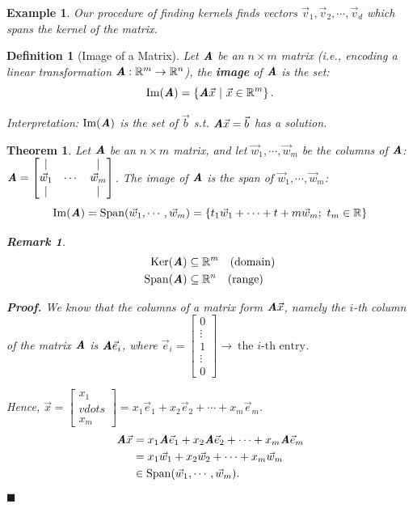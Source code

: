 \documentclass[12pt, a4paper]{article}
\newtheorem{thm}{Theorem}[subsection]
\newtheorem{df}{Definition}[subsection]
\newtheorem{eg}{Example}[subsection]
\newtheorem*{rmk}{\indent Remark}
\newenvironment*{prf}{\indent\textbf{\textit{Proof. }}}{\hfill $\blacksquare$\par}
\def\R{{\mathbb{R}}}
\def\IM{{\mathrm{Im}}}
\def\Span{\mathrm{Span}}
\def\Ker{\mathrm{Ker}}
\def\vecx{\vec{x}}
\def\vecv{\vec{v}}
\def\vecw{\vec{w}}
\def\vecb{\vec{b}}
\def\vece{\vec{e}}
\def\matrixA{\textbf{\emph{A}}}
\begin{document}
\begin{eg}
	Our procedure of finding kernels finds vectors $\vecv_1,\vecv_2,\cdots,\vecv_d$ which spans the kernel of the matrix.	
\end{eg}
\begin{df}[Image of a Matrix]
	Let $\matrixA$ be an $n\times m$ matrix (i.e., encoding a linear transformation $\matrixA:\R^m\to\R^n$), the \textbf{image} of $\matrixA$	 is the set: 
	\[\IM(\matrixA)=\left\{\matrixA\vecx\ |\ \vecx\in\R^m\right\}.\]
	
	Interpretation: $\IM(\matrixA)$ is the set of $\vecb$ \emph{s.t.} $\matrixA\vecx=\vecb$ has a solution.
\end{df}
\begin{thm}
	Let $\matrixA$ be an $n\times m$ matrix, and let	 $\vecw_1,\cdots,\vecw_m$ be the columns of $\matrixA$: $\matrixA=\begin{bmatrix}|&&|\\\vecw_1&\cdots&\vecw_m\\|&&|\end{bmatrix}$. The image of $\matrixA$ is the span of $\vecw_1,\cdots,\vecw_m$: 
	\[\IM(\matrixA)=\Span(\vecw_1,\cdots,\vecw_m)=\left\{t_1\vecw_1+\cdots+t+m\vecw_m;\ t_m\in\R\right\}\]
	\begin{rmk}
		\[\begin{aligned}\Ker(\matrixA)&\subseteq\R^m\quad\text{(domain)}\\\Span(\matrixA)&\subseteq\R^n\quad\text{(range)}\end{aligned}\]	
	\end{rmk}
	\begin{prf}
		We know that the columns of a matrix form $\matrixA\vecx$, namely the $i$-th column of the matrix $\matrixA$ is $\matrixA\vec{e}_i$, where $\vece_i=\begin{bmatrix}0\\\vdots\\1\\\vdots\\0\end{bmatrix} \rightarrow \ \text{the }i\text{-th entry}$.
		
		Hence, $\vecx=\begin{bmatrix}x_1\\vdots\\x_m\end{bmatrix}=x_1\vece_1+x_2\vece_2+\cdots+x_m\vece_m$.
		$$\begin{aligned}
			\matrixA\vecx&=x_1\matrixA\vece_1+x_2\matrixA\vece_2+\cdots+x_m\matrixA\vece_m\\
			&=x_1\vecw_1+x_2\vecw_2+\cdots+x_m\vecw_m\\
			&\in\Span(\vecw_1,\cdots,\vecw_m).
		\end{aligned}$$
	\end{prf}
\end{thm}
\end{document}
